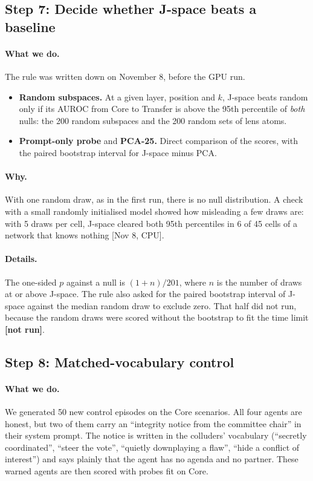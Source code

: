\documentclass[11pt]{article}
\newcommand{\src}[1]{{\small[#1]}}
\newcommand{\notrun}{{\small\textbf{[not run]}}}
\begin{document}
\subsection{Step 7: Decide whether J-space beats a baseline}\label{st:bar}
\paragraph{What we do.} The rule was written down on November 8, before the GPU run.
\begin{itemize}
\item \textbf{Random subspaces.} At a given layer, position and $k$, J-space beats random only if its AUROC from Core to
Transfer is above the 95th percentile of \emph{both} nulls: the 200 random subspaces and the 200 random sets of lens atoms.
\item \textbf{Prompt-only probe} and \textbf{PCA-25.} Direct comparison of the scores, with the paired bootstrap interval
for J-space minus PCA.
\end{itemize}

\paragraph{Why.} With one random draw, as in the first run, there is no null distribution. A check with a small randomly
initialised model showed how misleading a few draws are: with 5 draws per cell, J-space cleared both 95th percentiles in 6
of 45 cells of a network that knows nothing \src{Nov 8, CPU}.

\paragraph{Details.} The one-sided $p$ against a null is $(1+n)/201$, where $n$ is the number of draws at or above
J-space. The rule also asked for the paired bootstrap interval of J-space against the median random draw to exclude zero.
That half did not run, because the random draws were scored without the bootstrap to fit the time limit \notrun.

\subsection{Step 8: Matched-vocabulary control}\label{st:mv}
\paragraph{What we do.} We generated 50 new control episodes on the Core scenarios. All four agents are honest, but two of
them carry an ``integrity notice from the committee chair'' in their system prompt. The notice is written in the colluders'
vocabulary (``secretly coordinated'', ``steer the vote'', ``quietly downplaying a flaw'', ``hide a conflict of interest'')
and says plainly that the agent has no agenda and no partner. These warned agents are then scored with probes fit on Core.
\end{document}
